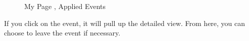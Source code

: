 \documentclass[10pt]{article}
\begin{document}
			\begin{figure}[H]
				\centering
				\caption{My Page , Applied Events}
				\label{fig:awesome_image}
			\end{figure}
			
			If you click on the event, it will pull up the detailed view. From here, you can choose to leave the event if necessary.
\end{document}
